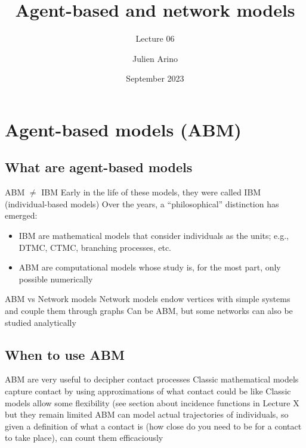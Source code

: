 \documentclass[aspectratio=43]{beamer}
\title{Agent-based and network models}
\subtitle{Lecture 06}
\author{Julien Arino}
\date{September 2023}
\begin{document}



\begin{frame}
  \titlepage
\end{frame}
\addtocounter{page}{-1}

\begin{frame}
    \tableofcontents[hideallsubsections]
\end{frame}
\addtocounter{page}{-1}

\section{Agent-based models (ABM)}

\subsection{What are agent-based models}

\begin{frame}{ABM $\neq$ IBM}
Early in the life of these models, they were called IBM (individual-based models)
\vfill
Over the years, a ``philosophical'' distinction has emerged:
\begin{itemize}
\item IBM are mathematical models that consider individuals as the units; e.g., DTMC, CTMC, branching processes, etc.
\item ABM are computational models whose study is, for the most part, only possible numerically 
\end{itemize}
\end{frame} 

\begin{frame}{ABM vs Network models}
Network models endow vertices with simple systems and couple them through graphs
\vfill
Can be ABM, but some networks can also be studied analytically
\end{frame} 


\subsection{When to use ABM}

\begin{frame}{ABM are very useful to decipher contact processes}
Classic mathematical models capture contact by using approximations of what contact could be like
\vfill
Classic models allow some flexibility (see section about incidence functions in Lecture X but they remain limited
\vfill
ABM can model actual trajectories of individuals, so given a definition of what a contact is (how close do you need to be for a contact to take place), can count them efficaciously
\end{frame} 
\end{document}
